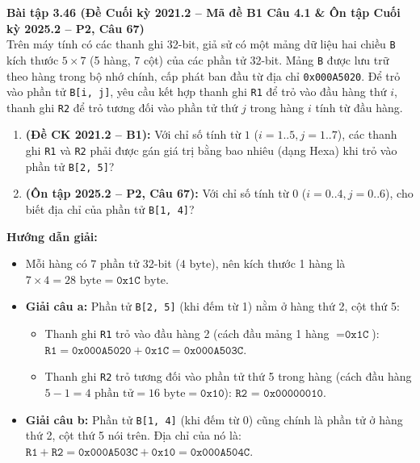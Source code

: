 \textbf{Bài tập 3.46 (Đề Cuối kỳ 2021.2 -- Mã đề B1 Câu 4.1 \& Ôn tập Cuối kỳ 2025.2 -- P2, Câu 67)}\\
Trên máy tính có các thanh ghi 32-bit, giả sử có một mảng dữ liệu hai chiều \texttt{B} kích thước $5 \times 7$ (5 hàng, 7 cột) của các phần tử 32-bit. Mảng \texttt{B} được lưu trữ theo hàng trong bộ nhớ chính, cấp phát ban đầu từ địa chỉ \texttt{0x000A5020}. Để trỏ vào phần tử \texttt{B[i, j]}, yêu cầu kết hợp thanh ghi \texttt{R1} để trỏ vào đầu hàng thứ $i$, thanh ghi \texttt{R2} để trỏ tương đối vào phần tử thứ $j$ trong hàng $i$ tính từ đầu hàng.
\begin{enumerate}[label=\alph*)]
    \item \textbf{(Đề CK 2021.2 -- B1):} Với chỉ số tính từ $1$ ($i = 1..5, j = 1..7$), các thanh ghi \texttt{R1} và \texttt{R2} phải được gán giá trị bằng bao nhiêu (dạng Hexa) khi trỏ vào phần tử \texttt{B[2, 5]}?
    \item \textbf{(Ôn tập 2025.2 -- P2, Câu 67):} Với chỉ số tính từ $0$ ($i = 0..4, j = 0..6$), cho biết địa chỉ của phần tử \texttt{B[1, 4]}?
\end{enumerate}
\textbf{Hướng dẫn giải:}
\begin{itemize}
    \item Mỗi hàng có $7$ phần tử 32-bit ($4\text{ byte}$), nên kích thước 1 hàng là $7 \times 4 = 28\text{ byte} = \texttt{0x1C}\text{ byte}$.
    \item \textbf{Giải câu a:} Phần tử \texttt{B[2, 5]} (khi đếm từ 1) nằm ở hàng thứ 2, cột thứ 5:
    \begin{itemize}
        \item Thanh ghi \texttt{R1} trỏ vào đầu hàng 2 (cách đầu mảng 1 hàng $= \texttt{0x1C}$): $\texttt{R1} = \texttt{0x000A5020} + \texttt{0x1C} = \mathbf{\texttt{0x000A503C}}$.
        \item Thanh ghi \texttt{R2} trỏ tương đối vào phần tử thứ 5 trong hàng (cách đầu hàng $5 - 1 = 4\text{ phần tử} = 16\text{ byte} = \texttt{0x10}$): $\mathbf{\texttt{R2 = 0x00000010}}$.
    \end{itemize}
    \item \textbf{Giải câu b:} Phần tử \texttt{B[1, 4]} (khi đếm từ 0) cũng chính là phần tử ở hàng thứ 2, cột thứ 5 nói trên. Địa chỉ của nó là: $\texttt{R1} + \texttt{R2} = \texttt{0x000A503C} + \texttt{0x10} = \mathbf{\texttt{0x000A504C}}$.
\end{itemize}

